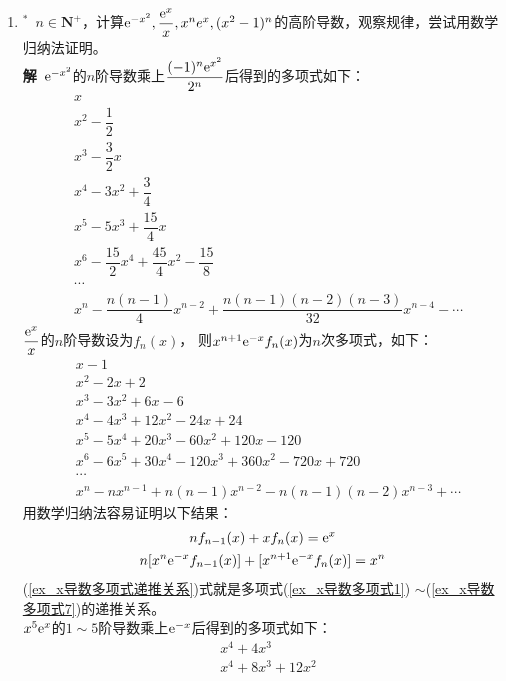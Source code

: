 \begin{enumerate}[label={【\textbf{例\thechapter.\arabic*}】},
 leftmargin=\inteval{\myenumleftmargin}pt,
 itemsep=\inteval{\myenumitempsep}pt,
 itemindent=\inteval{\myenumitemindent}pt]
\item $ ^* $\ $ n \in\textbf{N}^+ $，计算$ \mathrm{e}^{-x^2}, \dfrac{\mathrm{e}^x}{x},
x^ne^x,(x^2-1)^n $的高阶导数，观察规律，尝试用数学归纳法证明。\\
\textbf{解}\ 
$ \mathrm{e}^{-x^2} $的$ n $阶导数乘上$ \dfrac{(-1)^n\mathrm{e}^{x^2}}{2^n} $后得到的多项式如下：
\begin{align*}
    & x \\
    & x^2 -\dfrac{1}{2} \\
    & x^3 -\dfrac{3}{2}x \\
    & x^4 - 3x^2 + \dfrac{3}{4} \\
    & x^5 - 5x^3 + \dfrac{15}{4}x \\
    & x^6 -\dfrac{15}{2}x^4 + \dfrac{45}{4}x^2 - \dfrac{15}{8} \\
    & \cdots \\
    & x^n-\dfrac{n(n-1)}{4}x^{n-2}+\dfrac{n(n-1)(n-2)(n-3)}{32}x^{n-4}-\cdots 
\end{align*}
$ \dfrac{\mathrm{e}^x}{x} $的$ n $阶导数设为$ f_n(x) $，
则$ x^{n+1}\mathrm{e}^{-x}f_n(x) $为$ n $次多项式，如下：
\begin{align}
    & x-1    \label{ex_x导数多项式1}         \\
    & x^2-2x+2                              \\
    & x^3-3x^2+6x-6                         \\
    & x^4-4x^3+12x^2-24x+24                 \\
    & x^5-5x^4+20x^3-60x^2+120x-120         \\
    & x^6-6x^5+30x^4-120x^3+360x^2-720x+720  \\
    & \cdots  \nonumber \\
    & x^n-nx^{n-1}+n(n-1)x^{n-2}-n(n-1)(n-2)x^{n-3}+\cdots
    \label{ex_x导数多项式7}
\end{align}
用数学归纳法容易证明以下结果：
\begin{gather}
    nf_{n-1}(x)+xf_n(x)=\mathrm{e}^x \\
    n[x^{n}\mathrm{e}^{-x}f_{n-1}(x)]+[x^{n+1}\mathrm{e}^{-x}f_n(x)]=x^n 
    \label{ex_x导数多项式递推关系} 
\end{gather}
(\ref{ex_x导数多项式递推关系})式就是多项式(\ref{ex_x导数多项式1})
$ \sim $(\ref{ex_x导数多项式7})的递推关系。\\
$ x^5\mathrm{e}^x $的$ 1\sim 5 $阶导数乘上$ \mathrm{e}^{-x} $后得到的多项式如下：
\begin{align*}
    & x^4+4x^3                  \\
    & x^4+8x^3+12x^2            \\

\end{align*}
\end{enumerate}
